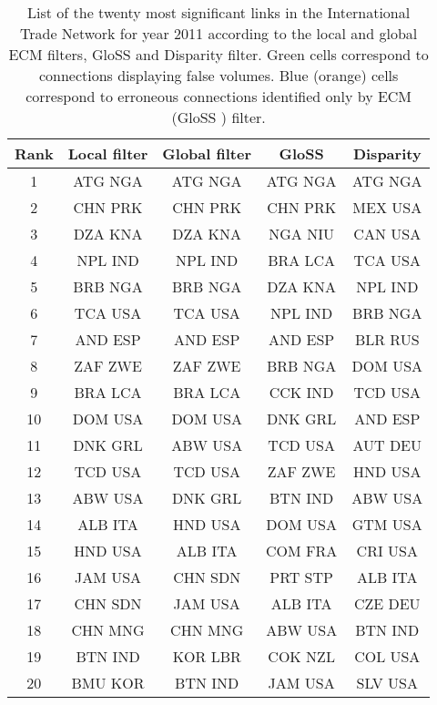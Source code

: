 \documentclass[aps,twocolumn,superscriptaddress]{revtex4-1}
\newcommand{\gloss}{GloSS }
\begin{document}
%
%
%
\begin{table}[ht!]
\centering
 \begin{small}
 \begin{tabular}{||c|c|c|c|c||} 
 \hline
 Rank & Local filter & Global filter & GloSS & Disparity\\ [0.5ex] 
 \hline\hline
 1 & {\cellcolor{green!25}} ATG NGA & {\cellcolor{green!25}} ATG NGA & {\cellcolor{green!25}} ATG NGA & {\cellcolor{green!25}} ATG NGA \\ \hline
 2 & CHN PRK & CHN PRK & CHN PRK & MEX USA \\ \hline
 3 & {\cellcolor{green!25}} DZA KNA & {\cellcolor{green!25}} DZA KNA & {\cellcolor{orange!25}} NGA NIU & CAN USA \\ \hline
 4 & NPL IND & NPL IND & BRA LCA & {\cellcolor{green!25}} TCA USA \\ \hline
 5 & {\cellcolor{green!25}} BRB NGA & {\cellcolor{green!25}} BRB NGA & {\cellcolor{green!25}} DZA KNA & NPL IND \\ \hline
 6 & {\cellcolor{green!25}} TCA USA & {\cellcolor{green!25}} TCA USA & NPL IND & {\cellcolor{green!25}} BRB NGA \\ \hline
 7 & AND ESP & AND ESP & AND ESP & BLR RUS \\ \hline
 8 & ZAF ZWE & ZAF ZWE & {\cellcolor{green!25}} BRB NGA & DOM USA \\ \hline
 9 & BRA LCA & BRA LCA & {\cellcolor{orange!25}} CCK IND & TCD USA \\ \hline
 10 & DOM USA & DOM USA & DNK GRL & AND ESP \\ \hline
 11 & DNK GRL & ABW USA & TCD USA & AUT DEU \\ \hline
 12 & TCD USA & TCD USA & ZAF ZWE & HND USA \\ \hline
 13 & ABW USA & DNK GRL & BTN IND & ABW USA \\ \hline
 14 & ALB ITA & HND USA & DOM USA & GTM USA \\ \hline
 15 & HND USA & ALB ITA & COM FRA & CRI USA \\ \hline
 16 & JAM USA & CHN SDN & PRT STP & ALB ITA \\ \hline
 17 & CHN SDN & JAM USA & ALB ITA & CZE DEU \\ \hline
 18 & CHN MNG & CHN MNG & ABW USA & BTN IND \\ \hline
 19 & BTN IND & {\cellcolor{cyan!25}} KOR LBR & COK NZL & COL USA \\ \hline
 20 & {\cellcolor{cyan!25}} BMU KOR & BTN IND & JAM USA & SLV USA \\ \hline
\end{tabular}
\end{small}
%
\caption{List of the twenty most significant links in the International Trade Network for year 2011 according to the local and global ECM filters, GloSS and Disparity filter. Green cells correspond to connections displaying false volumes. Blue (orange) cells correspond to erroneous connections identified only by ECM (\gloss) filter.}
\label{tab:tvg_trade_2011_top_20_signific_all}
%
\end{table}
%
\end{document}
